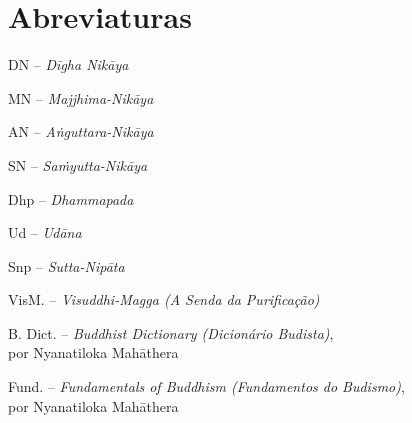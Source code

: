 \chapter{Abreviaturas}

DN -- \emph{Dīgha Nikāya}

MN -- \emph{Majjhima-Nikāya}

AN -- \emph{Aṅguttara-Nikāya}

SN -- \emph{Saṁyutta-Nikāya}

Dhp -- \emph{Dhammapada}

Ud -- \emph{Udāna}

Snp -- \emph{Sutta-Nipāta}

VisM. -- \emph{Visuddhi-Magga (A Senda da Purificação)}

B. Dict. -- \emph{Buddhist Dictionary (Dicionário Budista)},\\
por Nyanatiloka Mahāthera

Fund. -- \emph{Fundamentals of Buddhism (Fundamentos do Budismo)},\\
por Nyanatiloka Mahāthera
